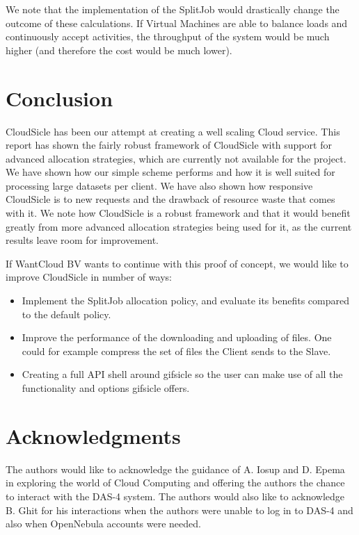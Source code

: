 \documentclass[twocolumn,twoside]{IEEEtran}
\begin{document}
We note that the implementation of the SplitJob would drastically change the
outcome of these calculations. If Virtual Machines are able to balance loads and
continuously accept activities, the throughput of the system would be much
higher (and therefore the cost would be much lower).

\section{Conclusion}
\label{sec:concl}
CloudSicle has been our attempt at creating a well scaling Cloud service.
This report has shown the fairly robust framework of CloudSicle with support
for advanced allocation strategies, which are currently not available for
the project. We have shown how our simple scheme performs and how
it is well suited for processing large datasets per client. We have also
shown how responsive CloudSicle is to new requests and the drawback of
resource waste that comes with it. We note how CloudSicle is a robust
framework and that it would benefit greatly from more advanced allocation
strategies being used for it, as the current results leave room for improvement.

If WantCloud BV wants to continue with this proof of concept, we would like to improve CloudSicle in number of ways:
\begin{itemize}
\item Implement the SplitJob allocation policy, and evaluate its benefits compared to the default policy.
\item Improve the performance of the downloading and uploading of files. One could for example compress the set of files the Client sends to the Slave.
\item Creating a full API shell around gifsicle so the user can make use of all the functionality and options gifsicle offers.
\end{itemize}

\section*{Acknowledgments}
\noindent The authors would like to acknowledge the guidance of A. Iosup and
D. Epema in exploring the world of Cloud Computing and offering
the authors the chance to interact with the DAS-4 system.
The authors would also like to acknowledge B. Ghit for his interactions
when the authors were unable to log in to DAS-4 and also when OpenNebula
accounts were needed.
\end{document}

